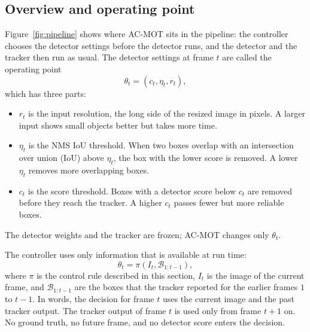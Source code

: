 \documentclass[pdflatex,sn-mathphys-num,iicol]{sn-jnl}
\begin{document}
\subsection{Overview and operating point}\label{sec:overview}
Figure~\ref{fig:pipeline} shows where AC-MOT sits in the pipeline: the
controller chooses the detector settings before the detector runs, and the
detector and the tracker then run as usual. The detector settings at frame
$t$ are called the operating point
\begin{equation}
\theta_t = (c_t, \eta_t, r_t),
\label{eq:theta}
\end{equation}
which has three parts:
\begin{itemize}
\item $r_t$ is the input resolution, the long side of the resized image in
      pixels. A larger input shows small objects better but takes more time.
\item $\eta_t$ is the NMS IoU threshold. When two boxes overlap with an
      intersection over union (IoU) above $\eta_t$, the box with the lower
      score is removed. A lower $\eta_t$ removes more overlapping boxes.
\item $c_t$ is the score threshold. Boxes with a detector score below $c_t$
      are removed before they reach the tracker. A higher $c_t$ passes fewer
      but more reliable boxes.
\end{itemize}
The detector weights and the tracker are frozen; AC-MOT changes only
$\theta_t$.

The controller uses only information that is available at run time:
\begin{equation}
\theta_t = \pi\left(I_t, \mathcal{B}_{1:t-1}\right),
\label{eq:policy}
\end{equation}
where $\pi$ is the control rule described in this section, $I_t$ is the image
of the current frame, and $\mathcal{B}_{1:t-1}$ are the boxes that the tracker
reported for the earlier frames $1$ to $t-1$. In words, the decision for frame
$t$ uses the current image and the past tracker output. The tracker output of
frame $t$ is used only from frame $t+1$ on. No ground truth, no future frame,
and no detector score enters the decision.
\end{document}
